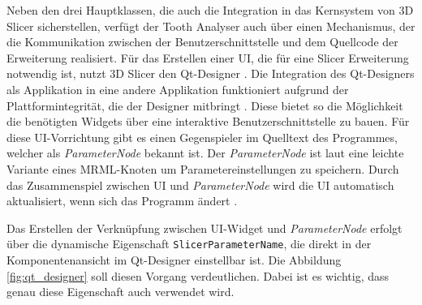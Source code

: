 Neben den drei Hauptklassen, die auch die Integration in das Kernsystem von 3D
Slicer sicherstellen, verfügt der Tooth Analyser auch über einen Mechanismus,
der die Kommunikation zwischen der Benutzerschnittstelle und dem Quellcode der
Erweiterung realisiert. Für das Erstellen einer \ac{UI}, die für eine Slicer Erweiterung
notwendig ist, nutzt 3D Slicer den Qt-Designer \citep[vgl.][]{qt2024}. Die
Integration des Qt-Designers als Applikation in eine andere Applikation
funktioniert aufgrund der Plattformintegrität, die der Designer mitbringt \citep[vgl.][]{qt2024}.
Diese bietet so die Möglichkeit die benötigten Widgets über eine interaktive Benutzerschnittstelle
zu bauen. Für diese \ac{UI}-Vorrichtung gibt es einen Gegenspieler im Quelltext des
Programmes, welcher als \textit{ParameterNode} bekannt ist. Der \textit{ParameterNode}
ist laut \citet{slicer2024} eine leichte Variante eines \ac{MRML}-Knoten um Parametereinstellungen
zu speichern. Durch das Zusammenspiel zwischen \ac{UI} und \textit{ParameterNode}
wird die \ac{UI} automatisch aktualisiert, wenn sich das Programm ändert \citep[vgl.][]{slicer2024}.

Das Erstellen der Verknüpfung zwischen \ac{UI}-Widget und \textit{ParameterNode}
erfolgt über die dynamische Eigenschaft \texttt{SlicerParameterName}, die direkt
in der Komponentenansicht im Qt-Designer einstellbar ist. Die Abbildung
\ref{fig:qt_designer} soll diesen Vorgang verdeutlichen. Dabei ist es wichtig,
dass genau diese Eigenschaft auch verwendet wird.

